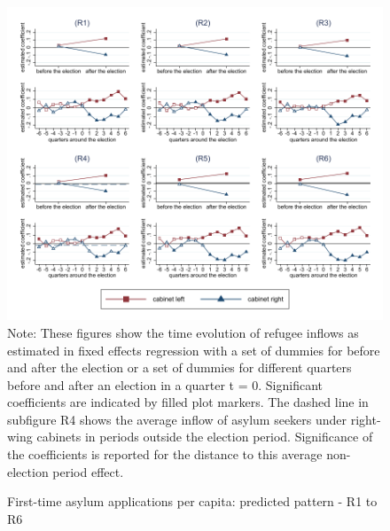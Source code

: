 \documentclass[11pt,a4paper]{scrartcl}
\begin{document}
\clearpage
\FloatBarrier



\clearpage
\FloatBarrier
\begin{figure}[!ht]
	\caption{First-time asylum applications per capita: predicted pattern - R1 to R6}
	\includegraphics[width=1\textwidth]{../results/applications/app_graphs_R1-R6.pdf}
	\footnotesize{Note: These figures show the time evolution of refugee inflows as estimated in fixed effects regression
		with a set of dummies for before and after the election or a set of dummies for different quarters before and after an election in a quarter t = 0. Significant coefficients are indicated by filled plot markers. The dashed line in subfigure R4 shows the average inflow of asylum seekers under right-wing cabinets in periods outside the election period. Significance of the coefficients is reported for the distance to this average non-election period effect.}
\end{figure}

\clearpage
\FloatBarrier





\clearpage
\FloatBarrier

\end{document}
